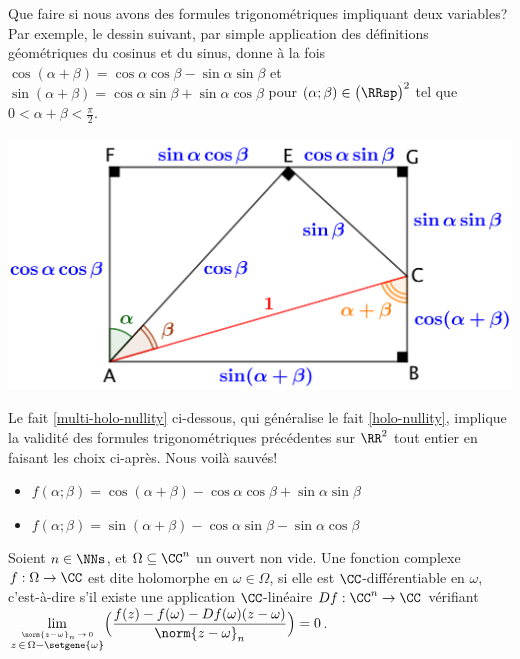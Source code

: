 Que faire si nous avons des formules trigonométriques impliquant deux variables? Par exemple, le dessin suivant, par simple application des définitions géométriques du cosinus et du sinus, donne à la fois
$\cos(\alpha + \beta) = \cos \alpha \cos \beta - \sin \alpha \sin \beta$
et
$\sin(\alpha + \beta) = \cos \alpha \sin \beta + \sin \alpha \cos \beta$
pour
$(\alpha ; \beta) \in \big( \RRsp \big)^2$ tel que $0 < \alpha + \beta < \frac{\pi}{2}$. 

\begin{center}
	\includegraphics[scale=.7]{two-var-trig-formulas.png}
\end{center}

Le fait \ref{multi-holo-nullity} ci-dessous, qui généralise le fait \ref{holo-nullity}, implique la validité des formules trigonométriques précédentes sur $\RR^2$ tout entier en faisant les choix ci-après.
Nous voilà sauvés!
%
\begin{itemize}[label=\small\textbullet]
	\item $f(\alpha ; \beta) = \cos(\alpha + \beta) - \cos \alpha \cos \beta + \sin \alpha \sin \beta$

	\item $f(\alpha ; \beta) = \sin(\alpha + \beta) - \cos \alpha \sin \beta - \sin \alpha \cos \beta$
\end{itemize}


\begin{defi}
    Soient $n \in \NNs$, et $\Omega \subseteq \CC^n$ un ouvert non vide.
	Une fonction complexe $f: \Omega \rightarrow \CC$ est dite holomorphe en $\omega \in \Omega$, 
	si elle est $\CC$-différentiable en $\omega$,
	c'est-à-dire s'il existe une application $\CC$-linéaire $Df: \CC^n \rightarrow \CC$
	vérifiant
	$\displaystyle \lim_{\stackrel{\norm{z - \omega}_n \, \rightarrow \, 0}{z \, \in \, \Omega - \setgene{\omega}}}\!\Big( \frac{f(z) - f(\omega) - Df(\omega) (z - \omega)}{\norm{z - \omega}_n} \Big) = 0$.
\end{defi}


